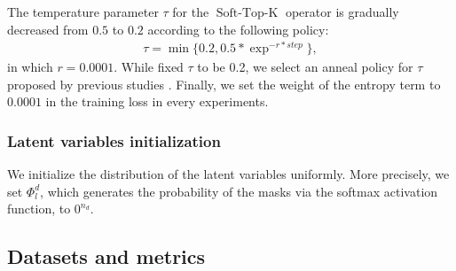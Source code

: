 \documentclass[11pt]{article}
\begin{document}
The temperature parameter $\tau$ for the $\operatorname{Soft-Top-K}$ operator is gradually decreased from $0.5$ to $0.2$ according to the following policy:
\begin{align*}
\tau = \operatorname{min}\{ 0.2, 0.5 * \exp^{-r*step} \},
\end{align*}
in which $r=0.0001$.
While \citet{Gong21pay,Gong21adaptive} fixed $\tau$ to be 0.2, we select an anneal policy for $\tau$ proposed by previous studies \citep{Jang17categorical}. Finally, we set the weight of the entropy term to $0.0001$ in the training loss in every experiments.
\subsubsection{Latent variables initialization}
We initialize the distribution of the latent variables uniformly. More precisely, we set $\Phi_l^d$, which generates the probability of the masks via the softmax activation function, to $0^{n_d}$.
\subsection{Datasets and metrics}
\end{document}
